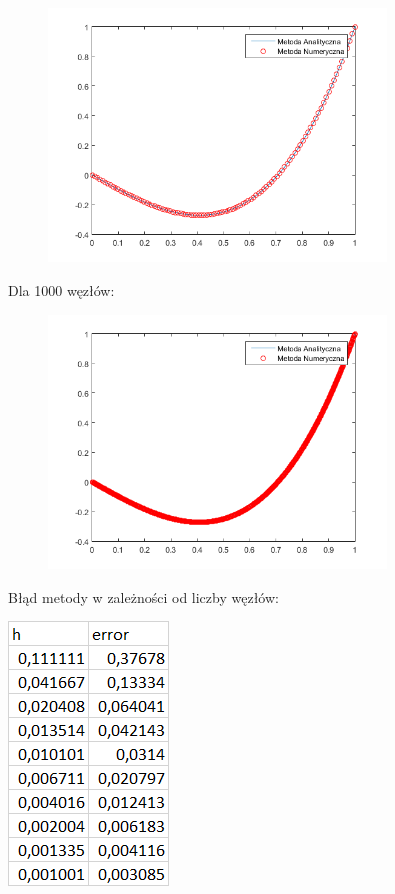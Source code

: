 \begin{figure}[!ht]
	\begin{center}
		\includegraphics[width=0.8\textwidth]{Lab3/charts/zad2/100.png}
	\end{center}
\end{figure}

Dla 1000 węzłów:

\begin{figure}[!ht]
	\begin{center}
		\includegraphics[width=0.8\textwidth]{Lab3/charts/zad2/1000.png}
	\end{center}
\end{figure}

\newpage

Błąd metody w zależności od liczby węzłów:

\includegraphics{Lab3/charts/zad2/error_dane.png}

